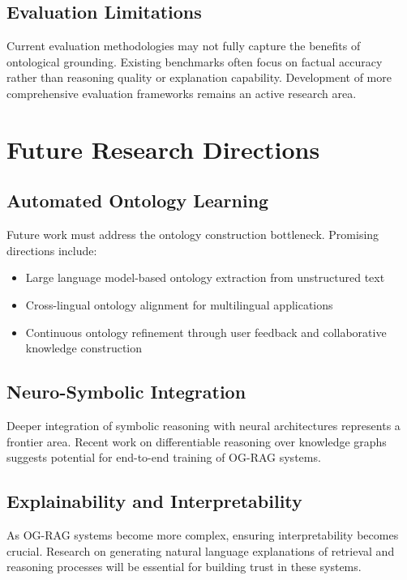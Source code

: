 \documentclass[12pt]{report}
\begin{document}
\subsection{Evaluation Limitations}

Current evaluation methodologies may not fully capture the benefits of ontological grounding. Existing benchmarks often focus on factual accuracy rather than reasoning quality or explanation capability. Development of more comprehensive evaluation frameworks remains an active research area.

\section{Future Research Directions}

\subsection{Automated Ontology Learning}

Future work must address the ontology construction bottleneck. Promising directions include:
\begin{itemize}
\item Large language model-based ontology extraction from unstructured text
\item Cross-lingual ontology alignment for multilingual applications \citep{chen2024multilingual}
\item Continuous ontology refinement through user feedback and collaborative knowledge construction \citep{zhou2024collaborative}
\end{itemize}

\subsection{Neuro-Symbolic Integration}

Deeper integration of symbolic reasoning with neural architectures represents a frontier area. Recent work on differentiable reasoning over knowledge graphs suggests potential for end-to-end training of OG-RAG systems.

\subsection{Explainability and Interpretability}

As OG-RAG systems become more complex, ensuring interpretability becomes crucial. Research on generating natural language explanations of retrieval and reasoning processes will be essential for building trust in these systems.
\end{document}
